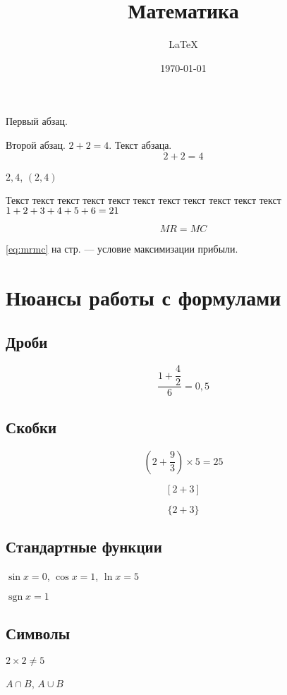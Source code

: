 \documentclass[a4paper,12pt]{article} %
\author{\LaTeX{}}
\title{Математика}
\date{\today}
\DeclareMathOperator{\sgn}{\mathop{sgn}}
\newcommand*{\hm}[1]{#1\nobreak\discretionary{}
{\hbox{$\mathsurround=0pt #1$}}{}}
\begin{document}

\maketitle

Первый         абзац.

Второй абзац.
$2 +    2 =   4   $. Текст абзаца.
\[  2+2=4  \]

$2,4$, $(2, 4)$

Текст текст текст текст текст текст текст текст текст текст текст $1\hm{+}2+3+4+5+6=21$

\begin{equation}\label{eq:mrmc}
MR=MC
\end{equation}


\eqref{eq:mrmc}  на стр. \pageref{eq:mrmc} --- условие максимизации прибыли.


\section{Нюансы работы с формулами}

\subsection{Дроби}

\[\frac{1+\dfrac{4}{2}}{6} = 0,5\]

\subsection{Скобки}

\[ \left(2+\frac{9}{3}\right) \times 5 = 25 \]

\[  [2+3]  \]

\[ \{2+3\}  \]

\subsection{Стандартные функции}

$\sin x = 0$, $\cos x = 1$, $\ln x = 5$

$\sgn  x = 1$

\subsection{Символы}

$2\times 2 \ne 5$

$A \cap B$, $A \cup B$
\end{document}
